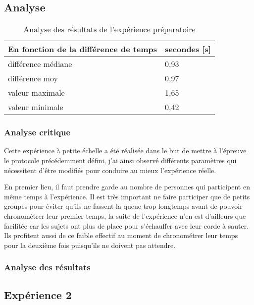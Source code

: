 \documentclass[12pt,fleqn,oneside,openany]{book} %
\begin{document}
\subsection{Analyse} \label{ssec:analyse2.1}

\begin{table}[h]
	\centering
	\caption{Analyse des résultats de l'expérience préparatoire} \label{tbl:analyse2.1P}
	\begin{tabular}{ll}
		\toprule 
		\textbf{En fonction de la différence de temps} & \textbf{secondes [s]} \\ \midrule
		différence médiane & 0,93 \\
		différence moy & 0,97 \\
		valeur maximale & 1,65 \\
		valeur minimale & 0,42 \\ \bottomrule
	\end{tabular}
\end{table}

\subsubsection{Analyse critique} \label{sssec:analyseCrit2.1}
Cette expérience à petite échelle a été réalisée dans le but de mettre à l'épreuve le protocole précédemment défini, j'ai ainsi observé différents paramètres qui nécessitent d'être modifiés pour conduire au mieux l'expérience réelle. 

En premier lieu, il faut prendre garde au nombre de personnes qui participent en même temps à l'expérience. Il est très important ne faire participer que de petits groupes pour éviter qu'ils ne fassent la queue trop longtemps avant de pouvoir chronométrer leur premier temps, la suite de l'expérience n'en est d'ailleurs que facilitée car les sujets ont plus de place pour s'échauffer avec leur corde à sauter. Ils profitent aussi de ce faible effectif au moment de chronométrer leur temps pour la deuxième fois puisqu'ils ne doivent pas attendre.

\subsubsection{Analyse des résultats} \label{sssec:analyseResult2.1}

\subsection{Expérience 2} \label{ssec:but2.2}
\end{document}
